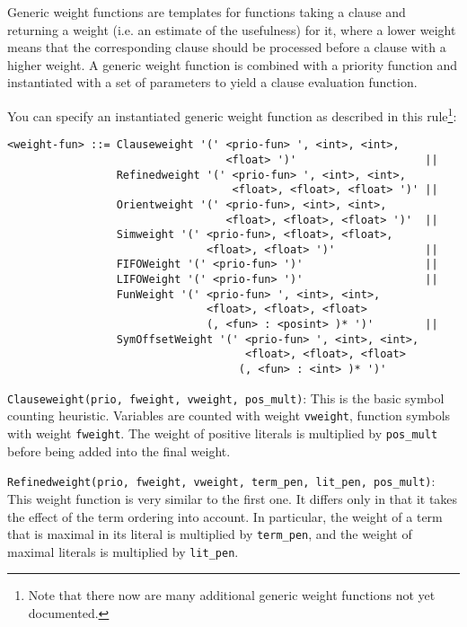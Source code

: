 \documentclass{report}
\begin{document}
Generic weight functions are templates for functions taking a clause
and returning a weight (i.e. an estimate of the usefulness) for it,
where a lower weight means that the corresponding clause should be
processed before a clause with a higher weight.  A generic weight
function is combined with a priority function and instantiated with a
set of parameters to yield a clause evaluation function.

You can specify an instantiated generic weight function as described
in this rule\footnote{Note that there now are many additional generic
  weight functions not yet documented.}:

\small
\begin{verbatim}
<weight-fun> ::= Clauseweight '(' <prio-fun> ', <int>, <int>,
                                  <float> ')'                    ||
                 Refinedweight '(' <prio-fun> ', <int>, <int>,
                                   <float>, <float>, <float> ')' ||
                 Orientweight '(' <prio-fun>, <int>, <int>,
                                  <float>, <float>, <float> ')'  ||
                 Simweight '(' <prio-fun>, <float>, <float>,
                               <float>, <float> ')'              ||
                 FIFOWeight '(' <prio-fun> ')'                   ||
                 LIFOWeight '(' <prio-fun> ')'                   ||
                 FunWeight '(' <prio-fun> ', <int>, <int>,
                               <float>, <float>, <float>
                               (, <fun> : <posint> )* ')'        ||
                 SymOffsetWeight '(' <prio-fun> ', <int>, <int>,
                                     <float>, <float>, <float>
                                    (, <fun> : <int> )* ')'
\end{verbatim}
\normalsize

\medskip
\noindent{}\texttt{Clauseweight(prio, fweight, vweight, pos\_mult)}:
This is the basic symbol counting heuristic. Variables are counted
with weight \texttt{vweight}, function symbols with weight
\texttt{fweight}. The weight of positive literals is multiplied by
\texttt{pos\_mult} before being added into the final weight.

\medskip
\begin{sloppypar}
\noindent{}\texttt{Refinedweight(prio, fweight, vweight,
    term\_pen, lit\_pen, pos\_mult)}:
This weight function is very similar to the first one. It differs only
in that it takes the effect of the term ordering into account. In
particular, the weight of a term that is maximal in its literal is
multiplied by \texttt{term\_pen}, and the weight of maximal
literals is multiplied by \texttt{lit\_pen}.
\end{sloppypar}
\end{document}
